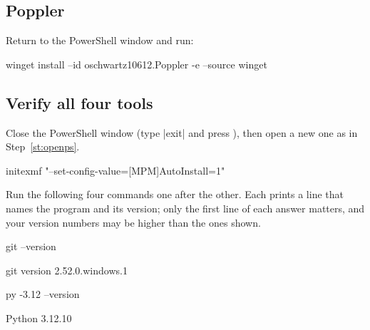 \subsection{Poppler}

Return to the PowerShell window and run:
\begin{ps}
winget install --id oschwartz10612.Poppler -e --source winget
\end{ps}

\subsection{Verify all four tools}

\label{st:newafterinstall}
Close the PowerShell window (type \code|exit| and press ), then open a new one as in
Step~\ref{st:openps}.


\label{st:autoinstall}
\begin{ps}
initexmf "--set-config-value=[MPM]AutoInstall=1"
\end{ps}

\label{st:verifytools}
Run the following four commands one after the other. Each prints a line that names the program
and its version; only the first line of each answer matters, and your version numbers may be
higher than the ones shown.

\begin{ps}
git --version
\end{ps}
\begin{out}
git version 2.52.0.windows.1
\end{out}

\begin{ps}
py -3.12 --version
\end{ps}
\begin{out}
Python 3.12.10
\end{out}

